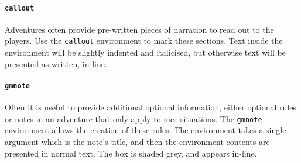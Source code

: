 \documentclass[10pt,a4paper]{article}
\begin{document}
\paragraph{\texttt{callout}} Adventures often provide pre-written pieces of
narration to read out to the players. Use the \texttt{callout} environment
to mark these sections. Text inside the environment will be slightly indented
and italicised, but otherwise text will be presented as written, in-line.

\paragraph{\texttt{gmnote}} Often it is useful to provide additional optional
information, either optional rules or notes in an adventure that only apply
to nice situations. The \texttt{gmnote} environment allows the creation of
these rules. The environment takes a single argument which is the note's
title, and then the environment contents are presented in normal text. The
box is shaded grey, and appears in-line.
\end{document}
